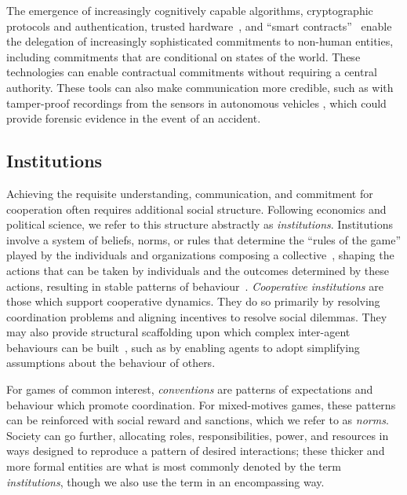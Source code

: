 \documentclass[11pt, a4paper, logo, onecolumn, nonumbering]{deepmind}
\begin{document}
The emergence of increasingly cognitively capable algorithms, cryptographic protocols and authentication, trusted hardware~\cite{lie2003implementing,bajaj2013trusteddb}, and ``smart contracts''~\cite{christidis2016blockchains,kosba2016hawk,luu2016making,bartoletti2017empirical,governatori2018legal,cong2019blockchain, wohrer2018design} enable the delegation of increasingly sophisticated commitments to non-human entities, including commitments that are conditional on states of the world. These technologies can enable contractual commitments without requiring a central authority. These tools can also make communication more credible, such as with tamper-proof recordings from the sensors in autonomous vehicles \cite{guo2020proof}, which could provide forensic evidence in the event of an accident. %





\subsection{Institutions}
\label{section:institutions}













Achieving the requisite understanding, communication, and commitment for cooperation often requires additional social structure. Following economics and political science, we refer to this structure abstractly as \textit{institutions}.  Institutions involve a system of beliefs, norms, or rules that determine the ``rules of the game'' played by the individuals and organizations composing a collective~\cite{greif2006institutions}, shaping the actions that can be taken by individuals and the outcomes determined by these actions, resulting in stable patterns of behaviour~\cite{schotter2008economic,ordeshook1986game,knight1992institutions,austen1998social,huntington2006political,maskin2008mechanism}. \textit{Cooperative institutions} are those which support cooperative dynamics. They do so primarily by resolving coordination problems and aligning incentives to resolve social dilemmas. They may also provide structural scaffolding upon which complex inter-agent behaviours can be built~\cite{moses1995artificial}, such as by enabling agents to adopt simplifying assumptions about the behaviour of others. 


For games of common interest, \textit{conventions} are patterns of expectations and behaviour which promote coordination. For mixed-motives games, these patterns can be reinforced with social reward and sanctions, which we refer to as \textit{norms}. Society can go further, allocating roles, responsibilities, power, and resources in ways designed to reproduce a pattern of desired interactions; these thicker and more formal entities are what is most commonly denoted by the term \textit{institutions}, though we also use the term in an encompassing way. 
\end{document}
